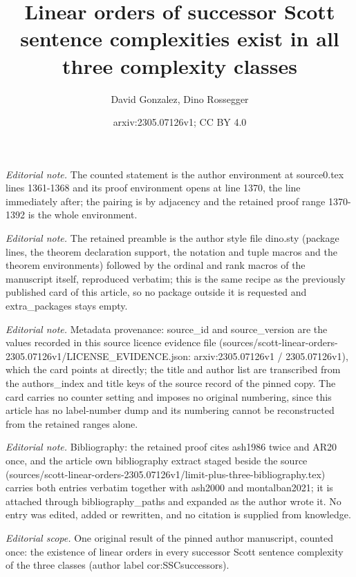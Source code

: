 \documentclass[10pt,a4paper]{amsart}
\title{Linear orders of successor Scott sentence complexities exist in all three complexity classes}
\author{David Gonzalez, Dino Rossegger}
\date{arxiv:2305.07126v1; CC BY 4.0}
\begin{document}
\maketitle
\noindent\textit{Editorial note.} The counted statement is the author environment at source0.tex lines 1361-1368 and its proof environment opens at line 1370, the line immediately after; the pairing is by adjacency and the retained proof range 1370-1392 is the whole environment.\par\medskip
\noindent\textit{Editorial note.} The retained preamble is the author style file dino.sty (package lines, the theorem declaration support, the notation and tuple macros and the theorem environments) followed by the ordinal and rank macros of the manuscript itself, reproduced verbatim; this is the same recipe as the previously published card of this article, so no package outside it is requested and extra\_packages stays empty.\par\medskip
\noindent\textit{Editorial note.} Metadata provenance: source\_id and source\_version are the values recorded in this source licence evidence file (sources/scott-linear-orders-2305.07126v1/LICENSE\_EVIDENCE.json: arxiv:2305.07126v1 / 2305.07126v1), which the card points at directly; the title and author list are transcribed from the authors\_index and title keys of the source record of the pinned copy. The card carries no counter setting and imposes no original numbering, since this article has no label-number dump and its numbering cannot be reconstructed from the retained ranges alone.\par\medskip
\noindent\textit{Editorial note.} Bibliography: the retained proof cites ash1986 twice and AR20 once, and the article own bibliography extract staged beside the source (sources/scott-linear-orders-2305.07126v1/limit-plus-three-bibliography.tex) carries both entries verbatim together with ash2000 and montalban2021; it is attached through bibliography\_paths and expanded as the author wrote it. No entry was edited, added or rewritten, and no citation is supplied from knowledge.\par\medskip
\noindent\textit{Editorial scope.} One original result of the pinned author manuscript, counted once: the existence of linear orders in every successor Scott sentence complexity of the three classes (author label cor:SSCsuccessors).\par\medskip
\end{document}
